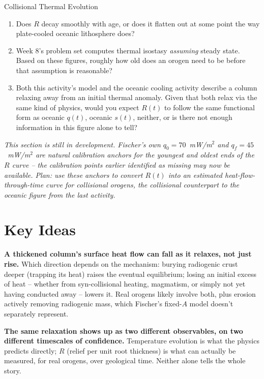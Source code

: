 \begin{activity}{Collisional Thermal Evolution}
\begin{questions}
\begin{enumerate}[label=(\alph*)]
  \item Does $R$ decay smoothly with age, or does it flatten out at some point the way plate-cooled oceanic lithosphere does?
  \answerbox[2cm]

  \item Week 8's problem set computes thermal isostasy \emph{assuming} steady state. Based on these figures, roughly how old does an orogen need to be before that assumption is reasonable?
  \answerbox[2.5cm]

  \item Both this activity's model and the oceanic cooling activity describe a column relaxing away from an initial thermal anomaly. Given that both relax via the same kind of physics, would you expect $R(t)$ to follow the same functional form as oceanic $q(t)$, oceanic $s(t)$, neither, or is there not enough information in this figure alone to tell?
  \answerbox[2.5cm]
\end{enumerate}


\textit{This section is still in development. Fischer's own $q_0=70$~mW/m$^2$ and $q_f=45$~mW/m$^2$ are natural calibration anchors for the youngest and oldest ends of the $R$ curve -- the calibration points earlier identified as missing may now be available. Plan: use these anchors to convert $R(t)$ into an estimated heat-flow-through-time curve for collisional orogens, the collisional counterpart to the oceanic figure from the last activity.}

\end{questions}

\section*{Key Ideas}

\textbf{A thickened column's surface heat flow can fall as it relaxes, not just rise.} Which direction depends on the mechanism: burying radiogenic crust deeper (trapping its heat) raises the eventual equilibrium; losing an initial excess of heat -- whether from syn-collisional heating, magmatism, or simply not yet having conducted away -- lowers it. Real orogens likely involve both, plus erosion actively removing radiogenic mass, which Fischer's fixed-$A$ model doesn't separately represent.

\textbf{The same relaxation shows up as two different observables, on two different timescales of confidence.} Temperature evolution is what the physics predicts directly; $R$ (relief per unit root thickness) is what can actually be measured, for real orogens, over geological time. Neither alone tells the whole story.


\end{activity}
